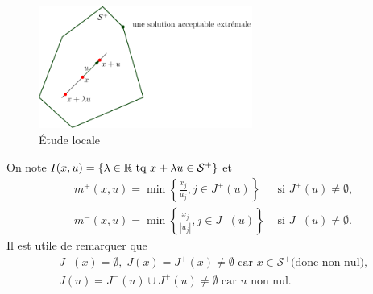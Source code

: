 \begin{figure}[h!]
  \centering
  \includegraphics[width=7cm]{Eproglin_1.pdf}
  \caption{\'Etude locale}
  \label{fig: Eproglin_1}
\end{figure}
\noindent
On note $I(x,u) = \left\lbrace \lambda \in \mathbb{R} \text{ tq } x + \lambda u \in \mathcal{S}^+ \right\rbrace$ et
\[
  \begin{aligned}
    &m^+(x,u) = \min\left\lbrace \frac{x_j}{u_j}, j \in J^+(u)\right\rbrace &\text{ si } J^+(u) \neq \emptyset,\\
    &m^-(x,u) = \min\left\lbrace \frac{x_j}{|u_j|}, j \in J^-(u)\right\rbrace &\text{ si } J^-(u) \neq \emptyset.
  \end{aligned}
\]
Il est utile de remarquer que 
\[
  \begin{aligned}
    &J^-(x) = \emptyset,\; J(x) = J^+(x) \neq \emptyset \text{ car } x\in \mathcal{S}^+ \text{(donc non nul)}, \\
    &J(u) = J^-(u) \cup J^+(u) \neq \emptyset \text{ car $u$ non nul}.
  \end{aligned}
\]

